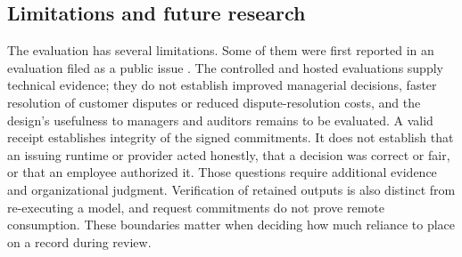 \documentclass[11pt]{article}
\begin{document}
\subsection{Limitations and future research}\label{sec:limitations}

The evaluation has several limitations. Some of them were first reported in an evaluation filed as a public issue \citep{latticeissue21}. The controlled and hosted evaluations supply technical evidence; they do not establish improved managerial decisions, faster resolution of customer disputes or reduced dispute-resolution costs, and the design's usefulness to managers and auditors remains to be evaluated. A valid receipt establishes integrity of the signed commitments. It does not establish that an issuing runtime or provider acted honestly, that a decision was correct or fair, or that an employee authorized it. Those questions require additional evidence and organizational judgment. Verification of retained outputs is also distinct from re-executing a model, and request commitments do not prove remote consumption. These boundaries matter when deciding how much reliance to place on a record during review.
\end{document}
